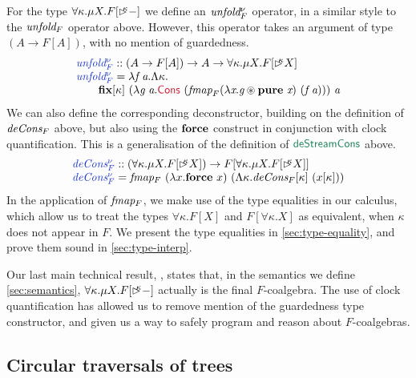 For the type $\forall \kappa. \mu X. F[\mathord{\rhd\kern-0.4em^{\kappa}}-]$ we define an
$\textit{unfold$^\nu_F$}$ operator, in a similar style to the
$\textit{unfold$_F$}$ operator above. However, this operator takes an
argument of type $(A \to F[A])$, with no mention of guardedness.
\begin{displaymath}
  \begin{array}{l}
    \defn{unfold$^\nu_F$} :: (A \to F[A]) \to A \to \forall \kappa. \mu X. F[\delay\kappa X] \\
    \defn{unfold$^\nu_F$} = \lambda \ident{f}\ \ident{a}. \Lambda \kappa. \\
    \quad\quad\kw{fix}[\kappa]\ (\lambda \ident{g}\ \ident{a}. \cons{Cons}\ (\ident{fmap}_F (\lambda \ident{x}. \ident{g} \circledast \kw{pure}\ \ident{x})\ (\ident{f}\ \ident{a})))\ \ident{a}
  \end{array}
\end{displaymath}
We can also define the corresponding deconstructor, building on the
definition of $\textit{deCons$_F$}$ above, but also using the $\textbf{force}$
construct in conjunction with clock quantification. This is a
generalisation of the definition of $\elim{deStreamCons}$ above.
\begin{displaymath}
  \begin{array}{l}
    \defn{deCons$^\nu_F$} :: (\forall \kappa. \mu X. F[\delay\kappa X]) \to F[\forall \kappa. \mu X. F[\delay\kappa X]] \\
    \defn{deCons$^\nu_F$} = \ident{fmap$_F$}\ (\lambda x. \kw{force}\ x)\ (\Lambda \kappa. \ident{deCons$_F$}[\kappa]\ (x[\kappa]))
  \end{array}
\end{displaymath}
In the application of $\textit{fmap$_F$}$, we make use of the type
equalities in our calculus, which allow us to treat the types $\forall
\kappa. F[X]$ and $F[\forall \kappa. X]$ as equivalent, when $\kappa$
does not appear in $F$. We present the type equalities in
\autoref{sec:type-equality}, and prove them sound in
\autoref{sec:type-interp}.

Our last main technical result, , states
that, in the semantics we define \autoref{sec:semantics}, $\forall
\kappa. \mu X. F[\mathord{\rhd\kern-0.4em^{\kappa}}-]$ actually is the final
$F$-coalgebra. The use of clock quantification has allowed us to
remove mention of the guardedness type constructor, and given us a way
to safely program and reason about $F$-coalgebras.

\subsection{Circular traversals of trees}
\label{sec:repmin}

